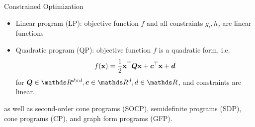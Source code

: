 \begin{vbframe}{Constrained Optimization}
\lz 

\begin{itemize}
	\item Linear program (LP): objective function $f$ and all constraints $g_i, h_j$ are linear functions
	\item Quadratic program (QP): objective function $f$ is a quadratic form, i.e. $$
	f(\mathbf{x}) = \frac{1}{2}\mathbf{x}^\top \bm{Q} \mathbf{x} + \bm{c}^\top \mathbf{x} + \bm{d} 
$$
for $\bm{Q} \in \R^{d \times d}, \bm{c} \in \R^d, d \in \R$, and constraints are linear.
\end{itemize}

as well as second-order cone programs (SOCP), semidefinite programs (SDP), cone programs (CP), and graph form programs (GFP). 

\end{vbframe}

\endlecture




